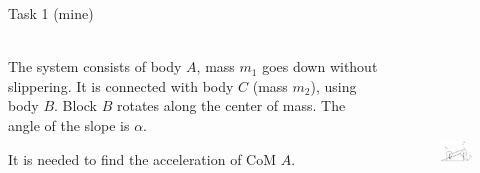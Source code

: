 \documentclass[aspectratio=169]{beamer}
\begin{document}
\begin{frame}[t]{Task 1 (mine)}
\framesubtitle{}
\begin{columns}[T,onlytextwidth]
    \begin{column}{0.54\textwidth}
        The system consists of body $A$, mass $m_1$ goes down without slippering. It is connected with body $C$ (mass $m_2$), using body $B$. Block $B$ rotates along the center of mass. The angle of the slope is $\alpha$.
        \medskip

        It is needed to find the acceleration of CoM $A$.
    \end{column}
    \begin{column}{0.44\textwidth}
        \begin{figure}[H]
            \centering\includegraphics[height=5cm,width=1\textwidth,keepaspectratio]{image22.png}
            \label{fig:image22.png}
        \end{figure}
    \end{column}
\end{columns}
\end{frame}
\end{document}
